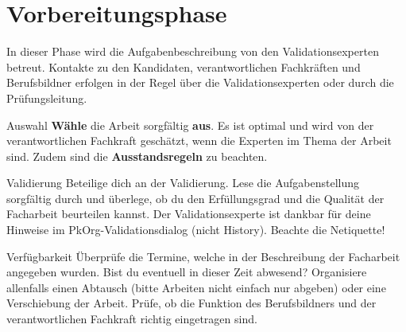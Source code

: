 \chapter{Vorbereitungsphase}
In dieser Phase wird die Aufgabenbeschreibung von den Validationsexperten betreut. Kontakte zu den Kandidaten, verantwortlichen Fachkräften und Berufsbildner erfolgen in der Regel über die Validationsexperten oder durch die Prüfungsleitung.

\begin{taskitemwithoutcomment}{Auswahl}
  \textbf{Wähle} die Arbeit sorgfältig \textbf{aus}. Es ist optimal und wird von der verantwortlichen Fachkraft geschätzt, wenn die Experten im Thema der Arbeit sind. Zudem sind die \textbf{Ausstandsregeln} zu beachten.
\end{taskitemwithoutcomment}
\begin{taskitem}{Validierung}
  Beteilige dich an der Validierung. Lese die Aufgabenstellung sorgfältig durch und überlege, ob du den Erfüllungsgrad und die Qualität der Facharbeit beurteilen kannst. Der Validationsexperte ist dankbar für deine Hinweise im PkOrg-Validationsdialog (nicht History). Beachte die Netiquette!
\end{taskitem}
\begin{taskitem}{Verfügbarkeit}
  Überprüfe die Termine, welche in der Beschreibung der Facharbeit angegeben wurden. Bist du eventuell in dieser Zeit abwesend? Organisiere allenfalls einen Abtausch (bitte Arbeiten nicht einfach nur abgeben) oder eine Verschiebung der Arbeit. Prüfe, ob die Funktion des Berufsbildners und der verantwortlichen Fachkraft richtig eingetragen sind.
\end{taskitem}